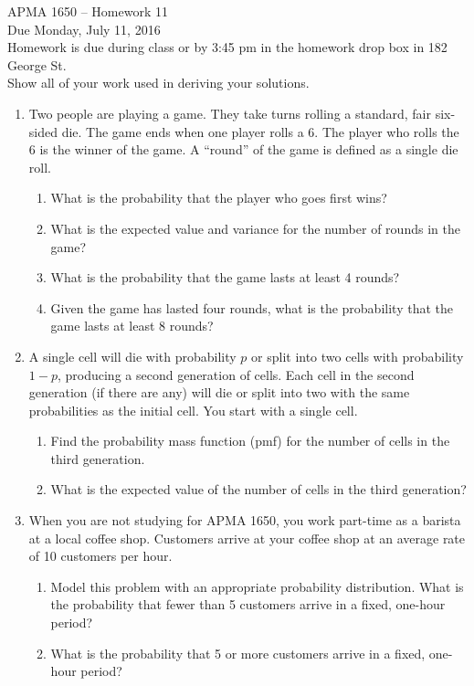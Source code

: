 \documentclass[12pt]{article}
\begin{document}
\title{}
\author{\vspace{-10ex} }

\begin{center}
{\LARGE APMA 1650 -- Homework 11}\\
\vspace{5mm}
{\large Due Monday, July 11, 2016}\\
\vspace{5mm}
Homework is due during class or by 3:45 pm in the homework drop box in 182 George St.\\
Show all of your work used in deriving your solutions.
\end{center}

\begin{enumerate}

\item Two people are playing a game. They take turns rolling a standard, fair six-sided die. The game ends when one player rolls a 6. The player who rolls the 6 is the winner of the game. A ``round'' of the game is defined as a single die roll.
\begin{enumerate}
\item What is the probability that the player who goes first wins?
\item What is the expected value and variance for the number of rounds in the game?
\item What is the probability that the game lasts at least 4 rounds?
\item Given the game has lasted four rounds, what is the probability that the game lasts at least 8 rounds?
\end{enumerate}

\item A single cell will die with probability $p$ or split into two cells with probability $1 − p$, producing a second generation of cells. Each cell in the second generation (if there are any) will die or split into two with the same probabilities as the initial cell. You start with a single cell.
\begin{enumerate}
\item Find the probability mass function (pmf) for the number of cells in the third generation.
\item What is the expected value of the number of cells in the third generation?
\end{enumerate}

\item When you are not studying for APMA 1650, you work part-time as a barista at a local coffee shop. Customers arrive at your coffee shop at an average rate of 10 customers per hour.
\begin{enumerate}
\item Model this problem with an appropriate probability distribution. What is the probability that fewer than 5 customers arrive in a fixed, one-hour period?
\item What is the probability that 5 or more customers arrive in a fixed, one-hour period?\\


\end{enumerate}
\end{enumerate}
\end{document}
